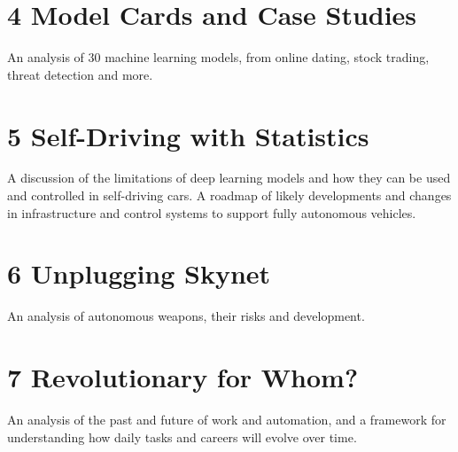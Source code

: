 \section*{4 Model Cards and Case Studies}

An analysis of 30 machine learning models, from online dating, stock trading, threat detection and more.

\section*{5 Self-Driving with Statistics}

A discussion of the limitations of deep learning models and how they can be used and controlled in self-driving cars. A roadmap of likely developments and changes in infrastructure and control systems to support fully autonomous vehicles.

\section*{6 Unplugging Skynet}

An analysis of autonomous weapons, their risks and development. 

\section*{7 Revolutionary for Whom?}

An analysis of the past and future of work and automation, and a framework for understanding how daily tasks and careers will evolve over time.
